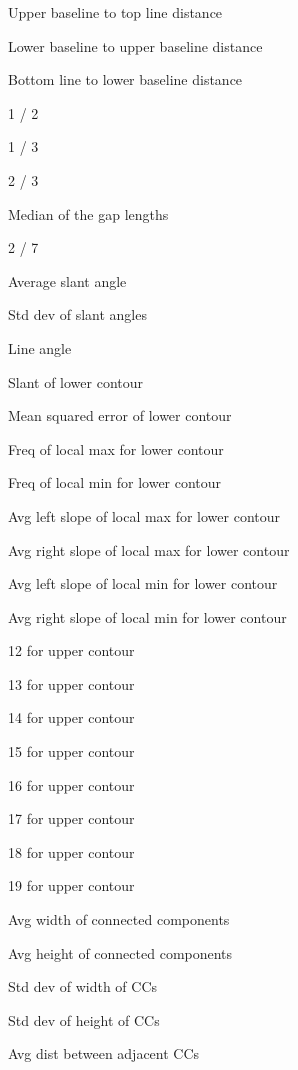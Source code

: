 \documentclass[paper=a4, fontsize=11pt]{scrartcl} %
\numberwithin{equation}{section} %
\numberwithin{figure}{section} %
\numberwithin{table}{section} %
\begin{document}
\begin{figure}
  \begin{multicols}{3}
    \begin{enumerate*}
    \item Upper baseline to top line distance
    \item Lower baseline to upper baseline distance
    \item Bottom line to lower baseline distance
    \item 1 / 2
    \item 1 / 3
    \item 2 / 3
    \item Median of the gap lengths
    \item 2 / 7
    \item Average slant angle
    \item Std dev of slant angles
    \item Line angle
    \item Slant of lower contour
    \item Mean squared error of lower contour
    \item Freq of local max for lower contour
    \item Freq of local min for lower contour
    \item Avg left slope of local max for lower contour
    \item Avg right slope of local max for lower contour
    \item Avg left slope of local min for lower contour
    \item Avg right slope of local min for lower contour
    \item 12 for upper contour
    \item 13 for upper contour
    \item 14 for upper contour
    \item 15 for upper contour
    \item 16 for upper contour
    \item 17 for upper contour
    \item 18 for upper contour
    \item 19 for upper contour
    \item Avg width of connected components
    \item Avg height of connected components
    \item Std dev of width of CCs
    \item Std dev of height of CCs
    \item Avg dist between adjacent CCs

\end{enumerate*}
\end{multicols}
\end{figure}
\end{document}

